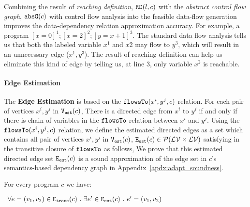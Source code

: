 Combining the result of \emph{reaching definition}, $\mathtt{RD}(l, c)$
with the \emph{abstract control flow graph}, $\mathtt{abs}{\mathtt{G}}(c)$ with control flow analysis into the feasible 
data-flow generation improves the data-dependency relation approximation accuracy. 
For example, a program $ [x = 0]^{1}; [x=2]^{2};  [y = x+1]^{3}$. 
The standard data flow analysis 
tells us that both the labeled variable $x^{1}$ and $x${2} may flow to $y^{3}$, which will result in an unnecessary edge ($x^{1}, y^{3}$). The result of reaching definition 
can help us eliminate this kind of edge by telling us, at line $3$, only variable $x^{2}$ is reachable. 
\paragraph{Edge Estimation}
The \textbf{Edge Estimation}
is based on the $\mathtt{flowsTo}(x^i, y^j, c)$ relation.
For each pair of vertices $x^i, y^j$ in $\mathtt{{V_{est}}}(c)$,
There is a directed edge from  $x^i$ to $y^j$ if and only if there is chain of variables 
in the $\mathtt{flowsTo}$ relation between $x^i$ and $y^j$. 
Using the $\mathtt{flowsTo}(x^i, y^j, c)$ relation, we define the estimated directed edges as a set which contains all
pair of vertices $x^i, y^j$ in $\mathtt{{V_{est}}}(c)$, 
$\mathtt{{E_{est}}}(c) \in \mathcal{P}( \mathcal{LV} \times \mathcal{LV})$
satisfying in the transitive closure of $\mathtt{flowsTo}$ as follows,
We prove that this estimated directed edge set $\mathtt{{E_{est}}}(c)$ is a sound approximation of the 
edge set in $c$'s semantics-based dependency graph 
in Appendix~\ref{apdx:adapt_soundness}.
\begin{lem}
	For every program $c$ we have:
   \begin{center}
$
	\begin{array}{l}
	\forall e = (v_1, v_2) \in \mathtt{{E_{trace}}}(c)
	~.~ 
	\exists e' \in \mathtt{{E_{est}}}(c) ~.~ e' = (v_1, v_2)
	\end{array}
$
\end{center} 
\end{lem}
